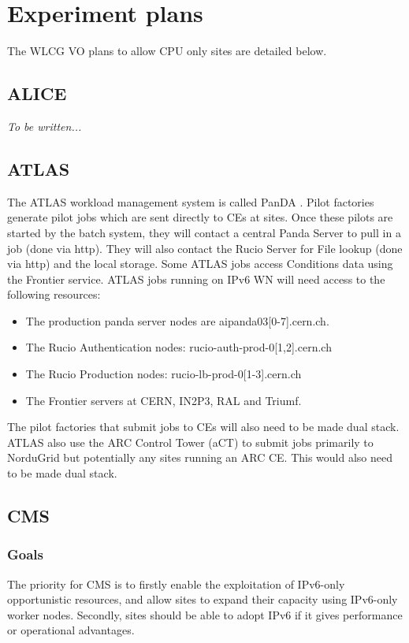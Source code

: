 \documentclass[11pt]{article}
\begin{document}
\section{Experiment plans}
The WLCG VO plans to allow CPU only sites are detailed below.  

\subsection{ALICE}
\emph{To be written...}

\subsection{ATLAS}
The ATLAS workload management system is called PanDA \cite{Panda}.  Pilot factories generate pilot jobs which are sent directly to CEs at sites.  Once these pilots are started by the batch system, they will contact a central Panda Server to pull in a job (done via http).  They will also contact the Rucio Server for File lookup (done via http) and the local storage.  Some ATLAS jobs access Conditions data using the Frontier service. ATLAS jobs running on IPv6 WN will need access to the following resources:
\begin{itemize}
\item The production panda server nodes are aipanda03[0-7].cern.ch.

\item The Rucio Authentication nodes: rucio-auth-prod-0[1,2].cern.ch

\item The Rucio Production nodes: rucio-lb-prod-0[1-3].cern.ch

\item The Frontier servers at CERN, IN2P3, RAL and Triumf.

\end{itemize}  

The pilot factories that submit jobs to CEs will also need to be made dual stack.  ATLAS also use the ARC Control Tower (aCT) to submit jobs primarily to NorduGrid but potentially any sites running an ARC CE.  This would also need to be made dual stack.


\subsection{CMS}
\subsubsection{Goals}
The priority for CMS is to firstly enable the exploitation of IPv6-only opportunistic resources, and allow sites to expand their capacity using IPv6-only worker nodes. Secondly, sites should be able to adopt IPv6 if it gives performance or operational advantages.
\end{document}
